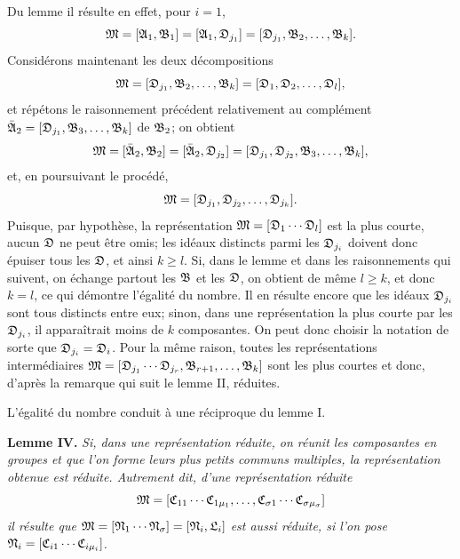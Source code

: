 Du lemme il résulte en effet, pour $i=1$,
\[
 \mathfrak{M}=[\mathfrak{A}_1,\mathfrak{B}_1]=[\mathfrak{A}_1,\mathfrak{D}_{j_1}]
          =[\mathfrak{D}_{j_1},\mathfrak{B}_2,\ldots,\mathfrak{B}_k].
\]
Considérons maintenant les deux décompositions
\[
 \mathfrak{M}=[\mathfrak{D}_{j_1},\mathfrak{B}_2,\ldots,\mathfrak{B}_k]
          =[\mathfrak{D}_1,\mathfrak{D}_2,\ldots,\mathfrak{D}_l],
\]
et répétons le raisonnement précédent relativement au complément $\bar{\mathfrak{A}}_2=[\mathfrak{D}_{j_1},\mathfrak{B}_3,\ldots,\mathfrak{B}_k]$ de $\mathfrak{B}_2$; on obtient
\[
 \mathfrak{M}=[\bar{\mathfrak{A}}_2,\mathfrak{B}_2]=[\bar{\mathfrak{A}}_2,\mathfrak{D}_{j_2}]
          =[\mathfrak{D}_{j_1},\mathfrak{D}_{j_2},\mathfrak{B}_3,\ldots,\mathfrak{B}_k],
\]
et, en poursuivant le procédé,
\[
 \mathfrak{M}=[\mathfrak{D}_{j_1},\mathfrak{D}_{j_2},\ldots,\mathfrak{D}_{j_k}].
\]
Puisque, par hypothèse, la représentation $\mathfrak{M}=[\mathfrak{D}_1\cdots\mathfrak{D}_l]$ est la plus courte, aucun $\mathfrak{D}$ ne peut être omis; les idéaux distincts parmi les $\mathfrak{D}_{j_i}$ doivent donc épuiser tous les $\mathfrak{D}$, et ainsi $k\ge l$. Si, dans le lemme et dans les raisonnements qui suivent, on échange partout les $\mathfrak{B}$ et les $\mathfrak{D}$, on obtient de même $l\ge k$, et donc $k=l$, ce qui démontre l'égalité du nombre. Il en résulte encore que les idéaux $\mathfrak{D}_{j_i}$ sont tous distincts entre eux; sinon, dans une représentation la plus courte par les $\mathfrak{D}_{j_i}$, il apparaîtrait moins de $k$ composantes. On peut donc choisir la notation de sorte que $\mathfrak{D}_{j_i}=\mathfrak{D}_i$. Pour la même raison, toutes les représentations intermédiaires $\mathfrak{M}=[\mathfrak{D}_{j_1}\cdots\mathfrak{D}_{j_r},\mathfrak{B}_{r+1},\ldots,\mathfrak{B}_k]$ sont les plus courtes et donc, d'après la remarque qui suit le lemme II, réduites.

L'égalité du nombre conduit à une réciproque du lemme I.

\textbf{Lemme IV.} \emph{Si, dans une représentation réduite, on réunit les composantes en groupes et que l'on forme leurs plus petits communs multiples, la représentation obtenue est réduite. Autrement dit, d'une représentation réduite}
\[
 \mathfrak{M}=[\mathfrak{C}_{11}\cdots\mathfrak{C}_{1\mu_1},\ldots,
           \mathfrak{C}_{\sigma1}\cdots\mathfrak{C}_{\sigma\mu_\sigma}]
\]
\emph{il résulte que $\mathfrak{M}=[\mathfrak{N}_1\cdots\mathfrak{N}_\sigma]=[\mathfrak{N}_i,\mathfrak{L}_i]$ est aussi réduite, si l'on pose $\mathfrak{N}_i=[\mathfrak{C}_{i1}\cdots\mathfrak{C}_{i\mu_i}]$.}


